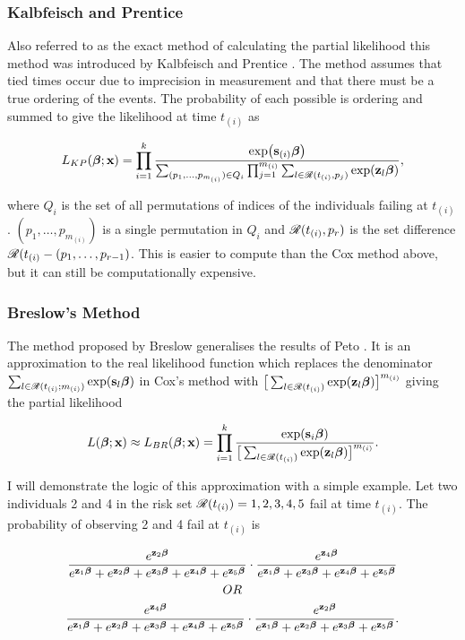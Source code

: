\subsubsection{Kalbfeisch and Prentice}

Also referred to as the exact method of calculating the partial likelihood this method was introduced by Kalbfeisch and Prentice . The method assumes that tied times occur due to imprecision in measurement and that there must be a true ordering of the events. The probability of each possible is ordering and summed to give the likelihood at time $t_{(i)}$ as

\begin{equation}
    L_{KP}(\boldsymbol{\beta};\textbf{x})=\prod_{i=1}^k\frac{\exp(\textbf{s}_{(i)}\boldsymbol{\beta})}{\sum_{(p_1,\ldots,p_{m_{(i)}})\in Q_i}\prod_{j=1}^{m_{(i)}}\sum_{l\in\mathscr{R}(t_{(i)},p_j)}\exp(\textbf{z}_l\boldsymbol{\beta})},
\end{equation}

where $Q_i$ is the set of all permutations of indices of the individuals failing at $t_{(i)}$. $(p_1,\ldots,p_{m_{(i)}})$ is a single permutation in $Q_i$ and $\mathscr{R}(t_{(i)},p_r)$ is the set difference $\mathscr{R}(t_{(i)}-(p_1,\ldots,p_{r-1})$. This is easier to compute than the Cox method above, but it can still be computationally expensive.

\subsubsection{Breslow's Method}

The method proposed by Breslow  generalises the results of Peto . It is an approximation to the real likelihood function which replaces the denominator $\sum_{l\in\mathscr{R}(t_{(i)};m_{(i)})}\exp(\textbf{s}_l\boldsymbol{\beta})$ in Cox's method with $\big[\sum_{l\in\mathscr{R}(t_{(i)})}\exp(\textbf{z}_l\boldsymbol{\beta})\big]^{m_{(i)}}$ giving the partial likelihood

\begin{equation}
    L(\boldsymbol{\beta};\textbf{x})\approx L_{BR}(\boldsymbol{\beta};\textbf{x})=\prod_{i=1}^k\frac{\exp(\textbf{s}_i\boldsymbol{\beta})}{\big[\sum_{l\in\mathscr{R}(t_{(i)})}\exp(\textbf{z}_l\boldsymbol{\beta})\big]^{m_{(i)}}}.
\end{equation}

I will demonstrate the logic of this approximation with a simple example. Let two individuals 2 and 4 in the risk set $\mathscr{R}(t_{(i)})={1,2,3,4,5}$ fail at time $t_{(i)}$. The probability of observing 2 and 4 fail at $t_{(i)}$ is

\begin{gather*}
    \frac{e^{\textbf{z}_2\boldsymbol{\beta}}}{e^{\textbf{z}_1\boldsymbol{\beta}}+e^{\textbf{z}_2\boldsymbol{\beta}}+e^{\textbf{z}_3\boldsymbol{\beta}}+e^{\textbf{z}_4\boldsymbol{\beta}}+e^{\textbf{z}_5\boldsymbol{\beta}}}\cdot\frac{e^{\textbf{z}_4\boldsymbol{\beta}}}{e^{\textbf{z}_1\boldsymbol{\beta}}+e^{\textbf{z}_3\boldsymbol{\beta}}+e^{\textbf{z}_4\boldsymbol{\beta}}+e^{\textbf{z}_5\boldsymbol{\beta}}}\\
    OR\\
    \frac{e^{\textbf{z}_4\boldsymbol{\beta}}}{e^{\textbf{z}_1\boldsymbol{\beta}}+e^{\textbf{z}_2\boldsymbol{\beta}}+e^{\textbf{z}_3\boldsymbol{\beta}}+e^{\textbf{z}_4\boldsymbol{\beta}}+e^{\textbf{z}_5\boldsymbol{\beta}}}\cdot\frac{e^{\textbf{z}_2\boldsymbol{\beta}}}{e^{\textbf{z}_1\boldsymbol{\beta}}+e^{\textbf{z}_2\boldsymbol{\beta}}+e^{\textbf{z}_3\boldsymbol{\beta}}+e^{\textbf{z}_5\boldsymbol{\beta}}}.
\end{gather*}

